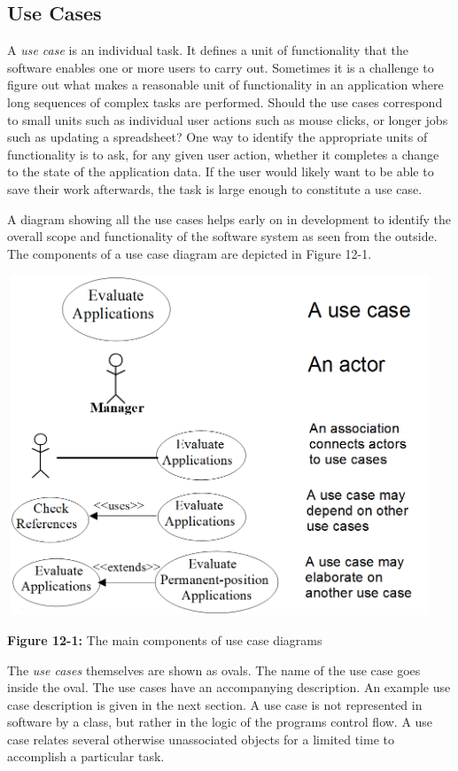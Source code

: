 \subsection{Use Cases}
A \textit{use case} is an individual task. It defines a
unit of functionality that the software enables one or more users to
carry out. Sometimes it is a challenge to figure out what makes a
reasonable {\textquotedbl}unit of functionality{\textquotedbl} in an
application where long sequences of complex tasks are performed. Should
the use cases correspond to small units such as individual user actions
such as mouse clicks, or longer jobs such as updating a spreadsheet?
One way to identify the appropriate units of functionality is to ask,
for any given user action, whether it completes a change to the state
of the application data. If the user would likely want to be able to
save their work afterwards, the task is large enough to constitute a
use case.

A diagram showing all the use cases helps early on in development to
identify the overall scope and functionality of the
software system as seen from the outside. The components of a use case
diagram are depicted in Figure 12-1.

\bigskip

\includegraphics[width=5.0in,height=4in]{ub-img/usecase.png}

{\sffamily\bfseries Figure 12-1:}
{\sffamily The main components of use case diagrams}

\bigskip

The \textit{use cases} themselves are shown as ovals. The name of the
use case goes inside the oval. The use cases have an accompanying
description. An example use case description is given in the next
section. A use case is not represented in software by a class, but
rather in the logic of the program{\textquotesingle}s control flow. A
use case relates several otherwise unassociated objects for a limited
time to accomplish a particular task.

